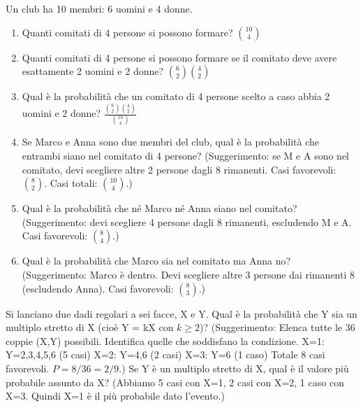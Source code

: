 \begin{exercise}
Un club ha 10 membri: 6 uomini e 4 donne.
\begin{enumerate}
    \item Quanti comitati di 4 persone si possono formare? $\binom{10}{4}$
    \item Quanti comitati di 4 persone si possono formare se il comitato deve avere esattamente 2 uomini e 2 donne? $\binom{6}{2}\binom{4}{2}$
    \item Qual è la probabilità che un comitato di 4 persone scelto a caso abbia 2 uomini e 2 donne? $\frac{\binom{6}{2}\binom{4}{2}}{\binom{10}{4}}$
    \item Se Marco e Anna sono due membri del club, qual è la probabilità che entrambi siano nel comitato di 4 persone?
    (Suggerimento: se M e A sono nel comitato, devi scegliere altre 2 persone dagli 8 rimanenti. Casi favorevoli: $\binom{8}{2}$. Casi totali: $\binom{10}{4}$.)
    \item Qual è la probabilità che né Marco né Anna siano nel comitato?
    (Suggerimento: devi scegliere 4 persone dagli 8 rimanenti, escludendo M e A. Casi favorevoli: $\binom{8}{4}$.)
    \item Qual è la probabilità che Marco sia nel comitato ma Anna no?
    (Suggerimento: Marco è dentro. Devi scegliere altre 3 persone dai rimanenti 8 (escludendo Anna). Casi favorevoli: $\binom{8}{3}$.)
\end{enumerate}
\end{exercise}

\begin{exercise}
Si lanciano due dadi regolari a sei facce, X e Y.
Qual è la probabilità che Y sia un multiplo stretto di X (cioè Y = kX con $k \ge 2$)?
(Suggerimento: Elenca tutte le 36 coppie (X,Y) possibili. Identifica quelle che soddisfano la condizione.
X=1: Y=2,3,4,5,6 (5 casi)
X=2: Y=4,6 (2 casi)
X=3: Y=6 (1 caso)
Totale 8 casi favorevoli. $P=8/36=2/9$.)
Se Y è un multiplo stretto di X, qual è il valore più probabile assunto da X?
(Abbiamo 5 casi con X=1, 2 casi con X=2, 1 caso con X=3. Quindi X=1 è il più probabile dato l'evento.)
\end{exercise}

